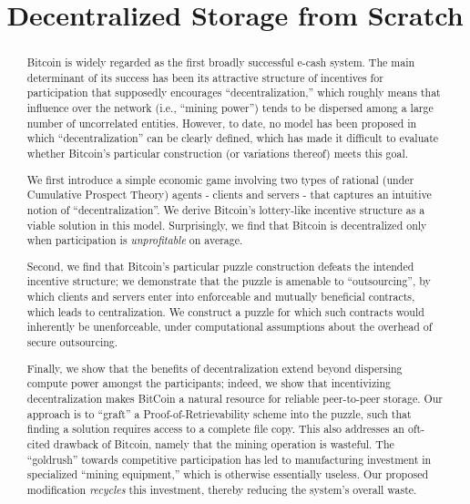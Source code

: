\documentclass{article}
\theoremstyle{definition}
\theoremstyle{remark}
\begin{document}
\title{Decentralized Storage from Scratch}

\maketitle

\begin{abstract}
  Bitcoin is widely regarded as the first broadly successful e-cash system. The main determinant of its success has been its attractive structure of incentives for participation that supposedly encourages ``decentralization,'' which roughly means that influence over the network (i.e., ``mining power'') tends to be dispersed among a large number of uncorrelated entities. However, to date, no model has been proposed in which ``decentralization'' can be clearly defined, which has made it difficult to evaluate whether Bitcoin's particular construction (or variations thereof) meets this goal.

We first introduce a simple economic game involving two types of rational (under Cumulative Prospect Theory) agents - clients and servers - that captures an intuitive notion of ``decentralization''. We derive Bitcoin's lottery-like incentive structure as a viable solution in this model. Surprisingly, we find that Bitcoin is decentralized only when participation is {\em unprofitable} on average.

Second, we find that Bitcoin's particular puzzle construction defeats the intended incentive structure; we demonstrate that the puzzle is amenable to ``outsourcing'', by which clients and servers enter into enforceable and mutually beneficial contracts, which leads to centralization. We construct a puzzle for which such contracts would inherently be unenforceable, under computational assumptions about the overhead of secure outsourcing.

Finally, we show that the benefits of decentralization extend beyond dispersing compute power amongst the participants; indeed, we show that incentivizing decentralization makes BitCoin a natural resource for reliable peer-to-peer storage. Our approach is to ``graft'' a Proof-of-Retrievability scheme into the puzzle, such that finding a solution requires access to a complete file copy. This also addresses an oft-cited drawback of Bitcoin, namely that the mining operation is wasteful. The ``goldrush'' towards competitive participation has led to manufacturing investment in specialized ``mining equipment,'' which is otherwise essentially useless. Our proposed modification {\em recycles} this investment, thereby reducing the system's overall waste.
\end{abstract}
\end{document}
